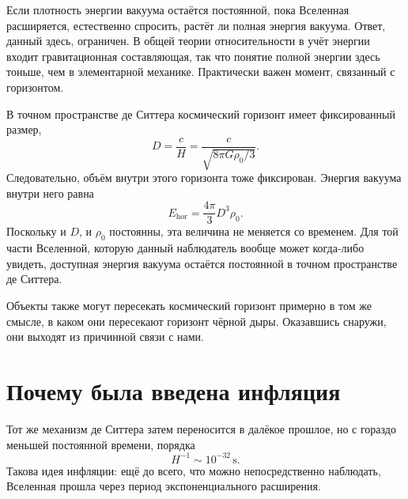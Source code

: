 Если плотность энергии вакуума остаётся постоянной, пока Вселенная расширяется, естественно спросить, растёт ли полная энергия вакуума. Ответ, данный здесь, ограничен. В общей теории относительности в учёт энергии входит гравитационная составляющая, так что понятие полной энергии здесь тоньше, чем в элементарной механике. Практически важен момент, связанный с горизонтом.

В точном пространстве де Ситтера космический горизонт имеет фиксированный размер,
\begin{equation}
D=\frac{c}{H}
=\frac{c}{\sqrt{8\pi G\rho_0/3}}.
\end{equation}
Следовательно, объём внутри этого горизонта тоже фиксирован. Энергия вакуума внутри него равна
\begin{equation}
E_{\mathrm{hor}}=\frac{4\pi}{3}D^3\rho_0.
\end{equation}
Поскольку и \(D\), и \(\rho_0\) постоянны, эта величина не меняется со временем. Для той части Вселенной, которую данный наблюдатель вообще может когда-либо увидеть, доступная энергия вакуума остаётся постоянной в точном пространстве де Ситтера.

Объекты также могут пересекать космический горизонт примерно в том же смысле, в каком они пересекают горизонт чёрной дыры. Оказавшись снаружи, они выходят из причинной связи с нами.

\begin{classroomqa}
\end{classroomqa}

\section{Почему была введена инфляция}

Тот же механизм де Ситтера затем переносится в далёкое прошлое, но с гораздо меньшей постоянной времени, порядка
\begin{equation}
H^{-1}\sim 10^{-32}\,\mathrm{s}.
\end{equation}
Такова идея инфляции: ещё до всего, что можно непосредственно наблюдать, Вселенная прошла через период экспоненциального расширения.

